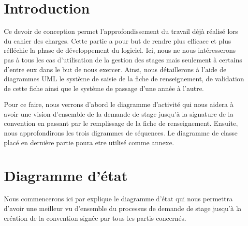 \documentclass{scrreprt}
\begin{document}
\tableofcontents

\chapter{Introduction}

Ce devoir de conception permet l'approfondissement du travail déjà réalisé lors du 
cahier des charges. Cette partie a pour but de rendre plus efficace et plus réfléchie la phase 
de développement du logiciel. Ici, nous ne nous intéresserons pas à tous les cas d'utilisation 
de la gestion des stages mais seulement à certains d'entre eux dans le but de nous exercer. Ainsi, 
nous détaillerons à l'aide de diagrammes UML le système de saisie de la fiche de renseignement, de  
validation de cette fiche ainsi que le système de passage d'une année à l'autre.  

	Pour ce faire, nous verrons d'abord le diagramme d'activité qui nous aidera à avoir une vision 
d'ensemble de la demande de stage jusqu'à la signature de la convention en passant par le remplissage
de la fiche de renseignement. Ensuite, nous approfondirons les trois digrammes de séquences. Le diagramme
de classe placé en dernière partie poura etre utilisé comme annexe. 

\newpage
\chapter{Diagramme d'état}

	Nous commencerons ici par explique le diagramme d'état qui nous permettra d'avoir une meilleur vu d'ensemble
du processus de demande de stage jusqu'à la création de la convention signée par tous les partis concernés. 
\end{document}
